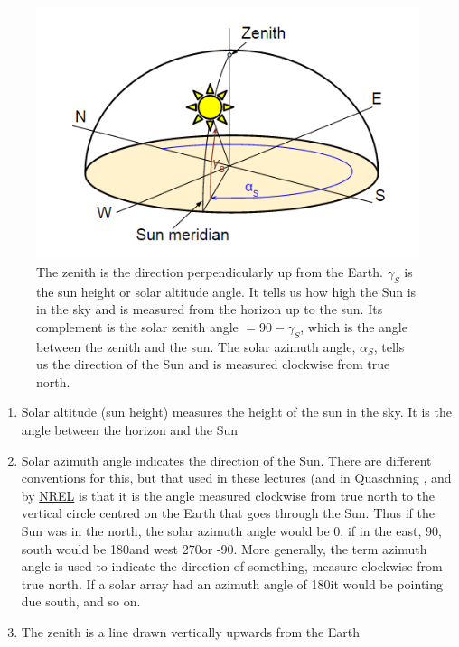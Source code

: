\documentclass{article} %
\begin{document}
\begin{solution}
    \begin{figure}[h]
    \includegraphics{SolarAngles}
    \caption{The zenith is the direction perpendicularly up from the Earth. $\gamma_S$ is the sun height or solar altitude angle. It tells us how high the Sun is in the sky and is measured from the horizon up to the sun. Its complement is the solar zenith angle $=90-\gamma_S$, which is the angle between the zenith and the sun.  The solar azimuth angle, $\alpha_S$, tells us the direction of the Sun and is measured clockwise from true north. }
    \end{figure}
    \begin{enumerate}[label=\alph*)]
        \item Solar altitude (sun height) measures the height of the sun in the sky. It is the angle between the horizon and the Sun
        \item Solar azimuth angle indicates the direction of the Sun. There are different conventions for this, but that used in these lectures (and in Quaschning \cite{Quaschning2005}, and by \href{http://www.nrel.gov/solar/}{NREL} is that it is the angle measured clockwise from true north to the vertical circle centred on the Earth that goes through the Sun. Thus if the Sun was in the north, the solar azimuth angle would be 0\degree, if in the east, 90\degree, south would be 180\degree and west 270\degree or -90\degree . More generally, the term azimuth angle is used to indicate the direction of something, measure clockwise from true north. If a solar array had an azimuth angle of 180\degree it would be pointing due south, and so on.
        \item The zenith is a line drawn vertically upwards from the Earth

\end{enumerate}
\end{solution}
\end{document}
